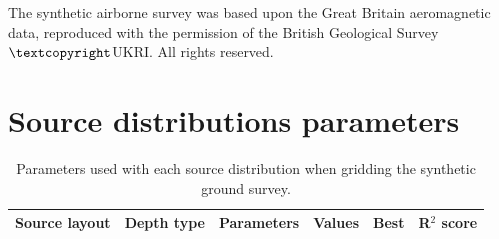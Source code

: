 \documentclass[twocolumn]{article}
\begin{document}
The synthetic airborne survey was based upon the Great Britain aeromagnetic
data, reproduced with the permission of the British Geological Survey
$\textcopyright$UKRI\@.
All rights reserved.


\appendix

\section{Source distributions parameters}

\begin{table}
    \centering
    \caption{
        Parameters used with each source distribution when gridding the
        synthetic ground survey.
    }
    \label{tab:parameters-ground-survey}
    \begin{tabular}{c c l c c c}
        \textbf{Source layout}
            & \textbf{Depth type}
            & \multicolumn{1}{c}{\textbf{Parameters}}
            & \textbf{Values}
            & \textbf{Best}
            & \textbf{R$^2$ score} \\
        \toprule


\end{tabular}
\end{table}
\end{document}
